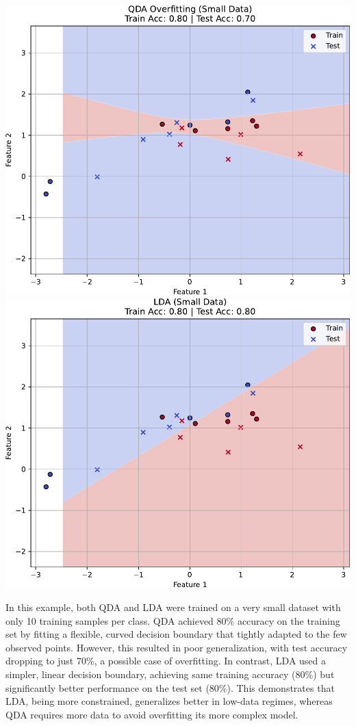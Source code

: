 \begin{examplebox}[: Overfitting]
    \begin{center}
        \includegraphics[width=.8\textwidth]{img/qda/overfitting-2.pdf}
        \highspace
        \includegraphics[width=.8\textwidth]{img/qda/overfitting-3.pdf}
    \end{center}

    In this example, both QDA and LDA were trained on a very small dataset with only 10 training samples per class. QDA achieved 80\% accuracy on the training set by fitting a flexible, curved decision boundary that tightly adapted to the few observed points. However, this resulted in poor generalization, with test accuracy dropping to just 70\%, a possible case of overfitting. In contrast, LDA used a simpler, linear decision boundary, achieving same training accuracy (80\%) but significantly better performance on the test set (80\%). This demonstrates that LDA, being more constrained, generalizes better in low-data regimes, whereas QDA requires more data to avoid overfitting its more complex model.
\end{examplebox}